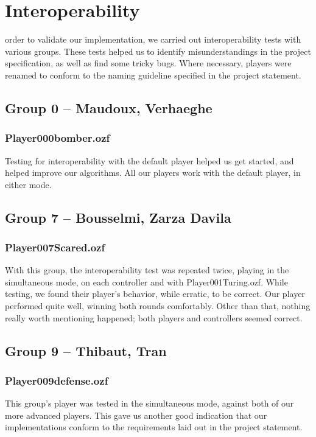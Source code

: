 \documentclass[12pt,journal]{IEEEtran}
\newcommand{\ntt}{\normalfont\ttfamily}
\newcommand{\fn}[1]{{\protect\ntt#1}}
\begin{document}
\section{Interoperability}
\label{sec:interop}
 order to validate our implementation, we carried out interoperability tests with various groups.
These tests helped us to identify misunderstandings in the project specification, as well as find some tricky bugs.
Where necessary, players were renamed to conform to the naming guideline specified in the project statement.

\subsection{Group 0 -- Maudoux, Verhaeghe}
\subsubsection{\fn{Player000bomber.ozf}}
Testing for interoperability with the default player helped us get started, and helped improve our algorithms.
All our players work with the default player, in either mode.

\subsection{Group 7 -- Bousselmi, Zarza Davila}
\subsubsection{\fn{Player007Scared.ozf}}
With this group, the interoperability test was repeated twice, playing in the simultaneous mode, on each controller and with \fn{Player001Turing.ozf}.
While testing, we found their player's behavior, while erratic, to be correct.
Our player performed quite well, winning both rounds comfortably.
Other than that, nothing really worth mentioning happened; both players and controllers seemed correct.

\subsection{Group 9 -- Thibaut, Tran}
\subsubsection{\fn{Player009defense.ozf}}
This group's player was tested in the simultaneous mode, against both of our more advanced players.
This gave us another good indication that our implementations conform to the requirements laid out in the project statement.
\end{document}
